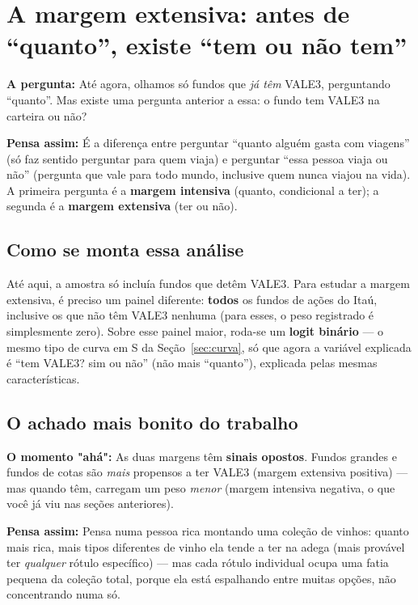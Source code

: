 \documentclass[11pt,a4paper]{article}
\newcommand{\pergunta}[1]{\par\vspace{4pt}\noindent\textbf{\color{azul}A pergunta:} #1\par\vspace{2pt}}
\newcommand{\analogia}[1]{\par\vspace{4pt}\noindent\textbf{\color{verde}Pensa assim:} #1\par\vspace{2pt}}
\newcommand{\aha}[1]{\par\vspace{4pt}\noindent\textbf{\color{vermelho}O momento "ahá":} #1\par\vspace{2pt}}
\begin{document}
\section{A margem extensiva: antes de ``quanto'', existe ``tem ou não tem''}
\label{sec:margens}

\pergunta{Até agora, olhamos só fundos que \emph{já têm} VALE3, perguntando ``quanto''. Mas
existe uma pergunta anterior a essa: o fundo tem VALE3 na carteira ou não?}

\analogia{É a diferença entre perguntar ``quanto alguém gasta com viagens'' (só faz sentido
perguntar para quem viaja) e perguntar ``essa pessoa viaja ou não'' (pergunta que vale para todo
mundo, inclusive quem nunca viajou na vida). A primeira pergunta é a \textbf{margem intensiva}
(quanto, condicional a ter); a segunda é a \textbf{margem extensiva} (ter ou não).}

\subsection{Como se monta essa análise}

Até aqui, a amostra só incluía fundos que detêm VALE3. Para estudar a margem extensiva, é preciso
um painel diferente: \textbf{todos} os fundos de ações do Itaú, inclusive os que não têm VALE3
nenhuma (para esses, o peso registrado é simplesmente zero). Sobre esse painel maior, roda-se um
\textbf{logit binário} --- o mesmo tipo de curva em S da Seção~\ref{sec:curva}, só que agora a
variável explicada é ``tem VALE3? sim ou não'' (não mais ``quanto''), explicada pelas mesmas
características.

\subsection{O achado mais bonito do trabalho}

\aha{As duas margens têm \textbf{sinais opostos}. Fundos grandes e fundos de cotas são \emph{mais}
propensos a ter VALE3 (margem extensiva positiva) --- mas quando têm, carregam um peso
\emph{menor} (margem intensiva negativa, o que você já viu nas seções anteriores).}

\analogia{Pensa numa pessoa rica montando uma coleção de vinhos: quanto mais rica, mais tipos
diferentes de vinho ela tende a ter na adega (mais provável ter \emph{qualquer} rótulo
específico) --- mas cada rótulo individual ocupa uma fatia pequena da coleção total, porque ela
está espalhando entre muitas opções, não concentrando numa só.}
\end{document}
